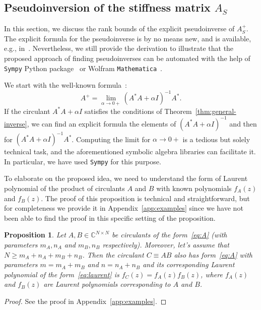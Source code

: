 \documentclass[a4paper]{article}
\newtheorem{proposition}{Proposition}[section]
\newcommand{\lap}{A_S}
\begin{document}
\subsection{Pseudoinversion of the stiffness matrix $\lap$}\label{sec:pseudo}

	In this section, we discuss the rank bounds of the explicit pseudoinverse of $\lap^+$.
	The explicit formula for the pseudoinverse is by no means new, and is available, e.g., in~\cite{plonka2016pseudo}.
	Nevertheless, we still provide the derivation to illustrate that the proposed approach of finding pseudoinverses can be automated with the help of \texttt{Sympy} Python package~\cite{sympy} or Wolfram \texttt{Mathematica}~\cite{Mathematica}.
	
	We start with the well-known formula~\cite{golub2013matrix}:
	\begin{equation}\label{eq:pseudoinverse-lim}
	    A^+ = \lim_{\alpha \to 0+} (A^*A + \alpha I)^{-1}A^*.
	\end{equation}
	If the circulant $A^*A + \alpha I$ satisfies the conditions of Theorem~\ref{thm:general-inverse}, we can find an explicit formula the elements of $(A^*A + \alpha I)^{-1}$ and then for $(A^*A + \alpha I)^{-1}A^*$.
	Computing the limit for $\alpha \to 0+$ is a tedious but solely technical task, and the aforementioned symbolic algebra libraries can facilitate it. 
	In particular, we have used \texttt{Sympy} for this purpose.
	
	To elaborate on the proposed idea, we need to understand the form of Laurent polynomial of the product of circulants $A$ and $B$ with known polynomials $f_A(z)$ and $f_B(z)$. The proof of this proposition is technical and straightforward, but for completeness we provide it in Appendix~\ref{app:examples} since we have not been able to find the proof in this specific setting of the proposition.
	
	\begin{proposition}\label{prop:laur_prod}
	Let $A,B \in \mathbb{C}^{N \times N}$ be circulants of the form~\eqref{eq:A} (with parameters $m_A, n_A$ and $m_B, n_B$ respectively).
	Moreover, let's assume that $N \ge m_A+n_A+m_B+n_B$.
	Then the circulant $C \equiv AB$ also has form~\eqref{eq:A} with parameters $m = m_A + m_B$ and $n = n_A+n_B$ and its corresponding Laurent polynomial of the form~\eqref{eq:laurent} is $f_C(z) = f_A(z)f_B(z)$, where $f_A(z)$ and $f_B(z)$ are Laurent polynomials corresponding to $A$ and $B$.
	\end{proposition}
	\begin{proof}
	    See the proof in Appendix~\ref{app:examples}.
	\end{proof}
	
\end{document}
